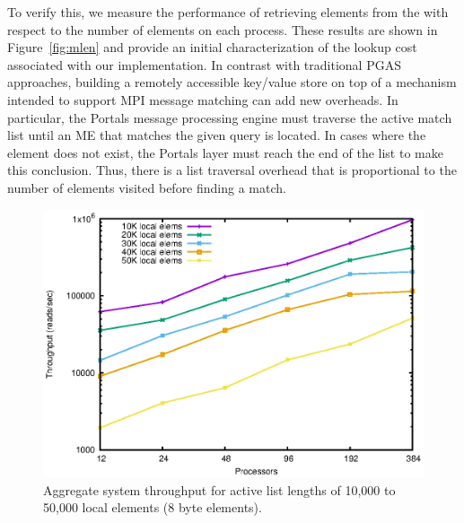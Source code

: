 To verify this, we measure the performance of retrieving elements from
the \pdht with respect to the number of elements on each process.
These results are shown in Figure~\ref{fig:mlen} and provide an
initial characterization of the lookup cost associated with our \pdht
implementation.  In contrast with traditional PGAS approaches,
building a remotely accessible key/value store on top of a mechanism
intended to support MPI message matching can add new overheads.  In
particular, the Portals message processing engine must traverse the
active match list until an ME that matches the given query is located.
In cases where the element does not exist, the Portals layer must
reach the end of the list to make this conclusion.  Thus, there is a
list traversal overhead that is proportional to the number of elements
visited before finding a match.

\begin{figure}
    \centering
    \includegraphics[width=.9\linewidth]{plots/throughput}
    \caption{Aggregate system throughput for active list lengths of 10,000 to 50,000 local elements (8 byte elements).}
    \label{fig:throughput}
\end{figure}

